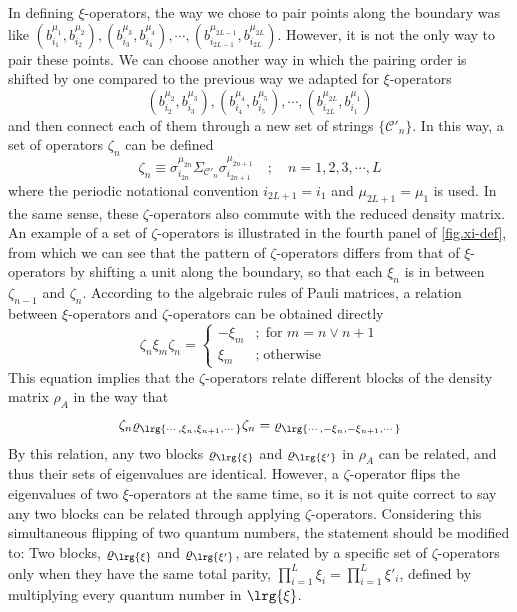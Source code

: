 In defining $\xi$-operators, the way we chose to pair points along the boundary was like $(b^{\mu_1}_{i_1},b^{\mu_2}_{i_2}), (b^{\mu_3}_{i_3},b^{\mu_4}_{i_4}),\cdots,(b^{\mu_{2L-1}}_{i_{2L-1}},b^{\mu_{2L}}_{i_{2L}})$. However, it is not the only way to pair these points. We can choose another way in which the pairing order is shifted by one compared to the previous way we adapted for $\xi$-operators
\[
(b^{\mu_2}_{i_2},b^{\mu_3}_{i_3}), (b^{\mu_4}_{i_4},b^{\mu_5}_{i_5}),\cdots,(b^{\mu_{2L}}_{i_{2L}},b^{\mu_1}_{i_1})
\]
and then connect each of them through a new set of strings $\{\mathcal{C}'_n\}$. In this way, a set of operators $\zeta_n$ can be defined
\begin{equation}\label{equ.spin-string-linking-gauge-zeta}
    \zeta_n \equiv \sigma^{\mu_{2n}}_{i_{2n}}\Sigma_{\mathcal{C}'_n}\sigma^{\mu_{2n+1}}_{i_{2n+1}} \quad ; \quad n=1,2,3,\cdots, L
\end{equation}
where the periodic notational convention $i_{2L+1}=i_1$ and $\mu_{2L+1}=\mu_1$ is used. In the same sense, these $\zeta$-operators also commute with the reduced density matrix. An example of a set of $\zeta$-operators is illustrated in the fourth panel of \autoref{fig.xi-def}, from which we can see that the pattern of $\zeta$-operators differs from that of $\xi$-operators by shifting a unit along the boundary, so that each $\xi_n$ is in between $\zeta_{n-1}$ and $\zeta_n$. According to the algebraic rules of Pauli matrices, a relation between $\xi$-operators and $\zeta$-operators can be obtained directly
\begin{equation}\label{equ.xi-zeta-relation}
    \zeta_n\xi_m\zeta_{n} =
\left\{
\begin{array}{ll}
   -\xi_m &;\; \text{for $m=n\vee n+1$} \\
   \xi_m  &;\; \text{otherwise} 
\end{array}
\right.
\end{equation}
This equation implies that the $\zeta$-operators relate different blocks of the density matrix $\rho_A$ in the way that
\begin{equation}\label{equ.related-blocks}
    \zeta_n \varrho_{\lrg{\cdots,\xi_n,\xi_{n+1},\cdots}}\zeta_n = \varrho_{\lrg{\cdots,-\xi_n,-\xi_{n+1},\cdots}}
\end{equation}
By this relation, any two blocks $\varrho_{\lrg{\xi}}$ and $\varrho_{\lrg{\xi'}}$ in $\rho_A$ can be related, and thus their sets of eigenvalues are identical. However, a $\zeta$-operator flips the eigenvalues of two $\xi$-operators at the same time, so it is not quite correct to say any two blocks can be related through applying $\zeta$-operators. Considering this simultaneous flipping of two quantum numbers, the statement should be modified to: Two blocks, $\varrho_{\lrg{\xi}}$ and $\varrho_{\lrg{\xi'}}$, are related by a specific set of $\zeta$-operators only when they have the same total parity, $\prod_{i=1}^{L}\xi_i = \prod_{i=1}^{L}\xi'_i$, defined by multiplying every quantum number in $\lrg{\xi}$.

